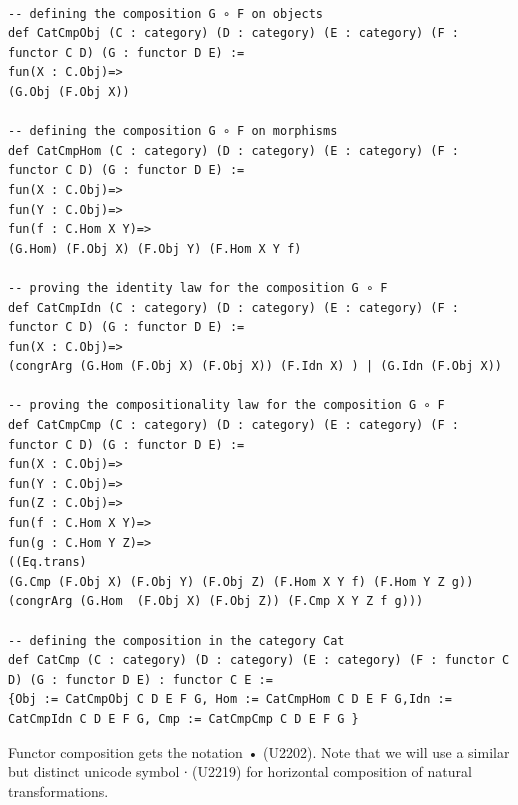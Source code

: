 \documentclass{book}
\newcounter{lcounter}
\begin{document}
\begin{center}
\begin{tcolorbox}[width=5in,colback={white},title={\begin{center}\texttt{Lean \thelcounter} \addtocounter{lcounter}{1}  \end{center}},colbacktitle=Blue,coltitle=black]
\begin{verbatim}

-- defining the composition G ∘ F on objects
def CatCmpObj (C : category) (D : category) (E : category) (F : functor C D) (G : functor D E) := 
fun(X : C.Obj)=>
(G.Obj (F.Obj X))

-- defining the composition G ∘ F on morphisms
def CatCmpHom (C : category) (D : category) (E : category) (F : functor C D) (G : functor D E) := 
fun(X : C.Obj)=>
fun(Y : C.Obj)=>
fun(f : C.Hom X Y)=>
(G.Hom) (F.Obj X) (F.Obj Y) (F.Hom X Y f)

-- proving the identity law for the composition G ∘ F
def CatCmpIdn (C : category) (D : category) (E : category) (F : functor C D) (G : functor D E) := 
fun(X : C.Obj)=> 
(congrArg (G.Hom (F.Obj X) (F.Obj X)) (F.Idn X) ) | (G.Idn (F.Obj X))

-- proving the compositionality law for the composition G ∘ F
def CatCmpCmp (C : category) (D : category) (E : category) (F : functor C D) (G : functor D E) := 
fun(X : C.Obj)=>
fun(Y : C.Obj)=>
fun(Z : C.Obj)=>
fun(f : C.Hom X Y)=>
fun(g : C.Hom Y Z)=>
((Eq.trans) 
(G.Cmp (F.Obj X) (F.Obj Y) (F.Obj Z) (F.Hom X Y f) (F.Hom Y Z g)) 
(congrArg (G.Hom  (F.Obj X) (F.Obj Z)) (F.Cmp X Y Z f g)))

-- defining the composition in the category Cat
def CatCmp (C : category) (D : category) (E : category) (F : functor C D) (G : functor D E) : functor C E := 
{Obj := CatCmpObj C D E F G, Hom := CatCmpHom C D E F G,Idn := CatCmpIdn C D E F G, Cmp := CatCmpCmp C D E F G }

\end{verbatim}%
\end{tcolorbox}
\end{center}

Functor composition gets the notation • (U2202). Note that we will use a similar but distinct unicode symbol ∙ (U2219) for horizontal composition of natural transformations. 
\end{document}
